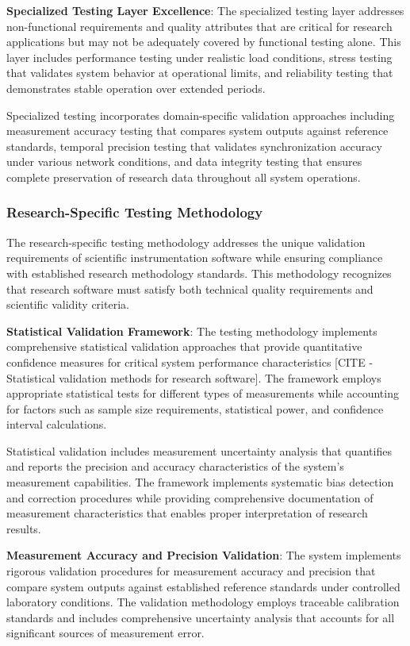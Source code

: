 \documentclass[11pt,a4paper]{report}
\begin{document}
\textbf{Specialized Testing Layer Excellence}: The specialized testing layer addresses non-functional requirements and
quality attributes that are critical for research applications but may not be adequately covered by functional testing
alone. This layer includes performance testing under realistic load conditions, stress testing that validates system
behavior at operational limits, and reliability testing that demonstrates stable operation over extended periods.

Specialized testing incorporates domain-specific validation approaches including measurement accuracy testing that
compares system outputs against reference standards, temporal precision testing that validates synchronization accuracy
under various network conditions, and data integrity testing that ensures complete preservation of research data
throughout all system operations.

\subsubsection{Research-Specific Testing Methodology}

The research-specific testing methodology addresses the unique validation requirements of scientific instrumentation
software while ensuring compliance with established research methodology standards. This methodology recognizes that
research software must satisfy both technical quality requirements and scientific validity criteria.

\textbf{Statistical Validation Framework}: The testing methodology implements comprehensive statistical validation approaches
that provide quantitative confidence measures for critical system performance
characteristics [CITE - Statistical validation methods for research software]. The framework employs appropriate
statistical tests for different types of measurements while accounting for factors such as sample size requirements,
statistical power, and confidence interval calculations.

Statistical validation includes measurement uncertainty analysis that quantifies and reports the precision and accuracy
characteristics of the system's measurement capabilities. The framework implements systematic bias detection and
correction procedures while providing comprehensive documentation of measurement characteristics that enables proper
interpretation of research results.

\textbf{Measurement Accuracy and Precision Validation}: The system implements rigorous validation procedures for measurement
accuracy and precision that compare system outputs against established reference standards under controlled laboratory
conditions. The validation methodology employs traceable calibration standards and includes comprehensive uncertainty
analysis that accounts for all significant sources of measurement error.
\end{document}
